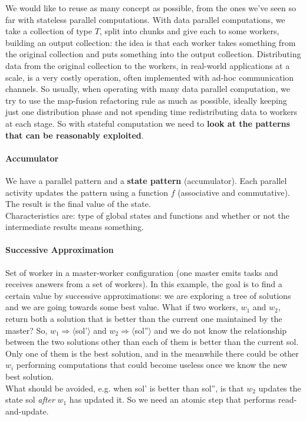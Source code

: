 \documentclass[10pt]{report}
\begin{document}
We would like to reuse as many concept as possible, from the ones we've seen so far with stateless parallel computations. With data parallel computations, we take a collection of type $T$, split into chunks and give each to some workers, building an output collection: the idea is that each worker takes something from the original collection and puts something into the output collection. Distributing data from the original collection to the workers, in real-world applications at a scale, is a very costly operation, often implemented with ad-hoc communication channels. So usually, when operating with many data parallel computation, we try to use the map-fusion refactoring rule as much as possible, ideally keeping just one distribution phase and not spending time redistributing data to workers at each stage. So with stateful computation we need to \textbf{look at the patterns that can be reasonably exploited}.
\paragraph{Accumulator} We have a parallel pattern and a \textbf{state pattern} (accumulator). Each parallel activity updates the pattern using a function $f$ (associative and commutative). The result is the final value of the state.\\
Characteristics are: type of global states and functions and whether or not the intermediate results means something.
\paragraph{Successive Approximation} Set of worker in a master-worker configuration (one master emits tasks and receives answers from a set of workers). In this example, the goal is to find a certain value by successive approximations: we are exploring a tree of solutions and we are going towards some best value. What if two workers, $w_1$ and $w_2$, return both a solution that is better than the current one maintained by the master? So, $w_1 \Rightarrow\langle$sol'$\rangle$ and $w_2\Rightarrow\langle$sol''$\rangle$ and we do not know the relationship between the two solutions other than each of them is better than the current sol. Only one of them is the best solution, and in the meanwhile there could be other $w_i$ performing computations that could become useless once we know the new best solution.\\
What should be avoided, e.g. when sol' is better than sol'', is that $w_2$ updates the state sol \textit{after} $w_1$ has updated it. So we need an atomic step that performs read-and-update.
\end{document}
